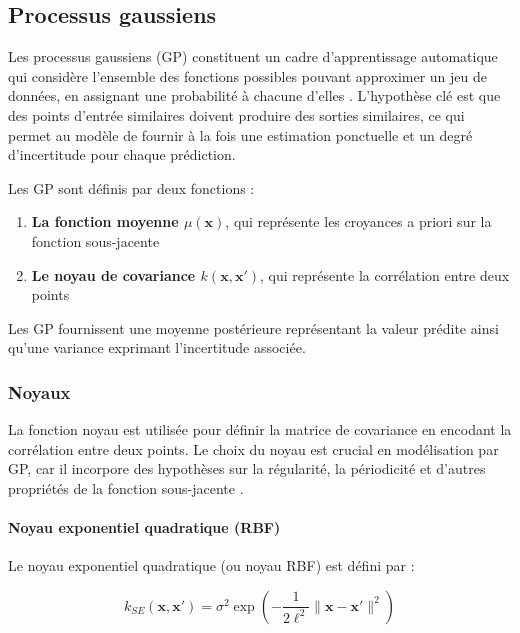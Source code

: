 \subsection{Processus gaussiens}

Les processus gaussiens (GP) constituent un cadre d'apprentissage automatique qui considère l'ensemble des fonctions possibles pouvant approximer un jeu de données, en assignant une probabilité à chacune d'elles \cite{rasmussen2006gaussian}. L'hypothèse clé est que des points d'entrée similaires doivent produire des sorties similaires, ce qui permet au modèle de fournir à la fois une estimation ponctuelle et un degré d'incertitude pour chaque prédiction.

Les GP sont définis par deux fonctions :

\begin{enumerate}[noitemsep]
    \item \textbf{La fonction moyenne $\mu(\mathbf{x})$}, qui représente les croyances a priori sur la fonction sous-jacente
    \item \textbf{Le noyau de covariance $k(\mathbf{x}, \mathbf{x}')$}, qui représente la corrélation entre deux points
\end{enumerate}

Les GP fournissent une moyenne postérieure représentant la valeur prédite ainsi qu'une variance exprimant l'incertitude associée.

\subsubsection{Noyaux}
La fonction noyau est utilisée pour définir la matrice de covariance en encodant la corrélation entre deux points. Le choix du noyau est crucial en modélisation par GP, car il incorpore des hypothèses sur la régularité, la périodicité et d'autres propriétés de la fonction sous-jacente \cite{martens2016gpis}.

\paragraph{Noyau exponentiel quadratique (RBF)}

Le noyau exponentiel quadratique (ou noyau RBF) est défini par :

\begin{equation}
k_{SE}(\mathbf{x}, \mathbf{x}') = \sigma^2 \exp \left(- \frac{1}{2\ell^2} \|\mathbf{x} - \mathbf{x}'\|^2 \right)
\end{equation}

